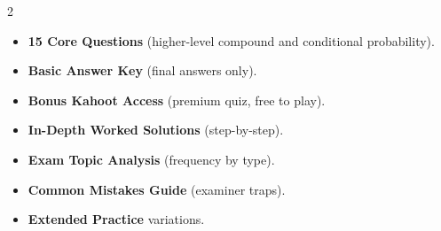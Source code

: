 \documentclass[11pt,a4paper]{article}
\newcommand{\FullReleaseDate}{April 30, 2026}
\begin{document}
\vspace{8pt}

\begin{multicols}{2}
  \begin{tcolorbox}[card, title=\sffamily\bfseries\textcolor{white}{\faHandPointDown\ TODAY (Simplified Version)}, colbacktitle=mainblue, boxed title style={sharp corners, boxrule=0pt}]
    \begin{itemize}[leftmargin=1.2em, itemsep=2pt]
      \item \small \textbf{15 Core Questions} (higher-level compound and conditional probability).
      \item \small \textbf{Basic Answer Key} (final answers only).
      \item \small \textbf{Bonus Kahoot Access} (premium quiz, free to play).
    \end{itemize}
  \end{tcolorbox}

  \columnbreak

  \begin{tcolorbox}[card, title=\sffamily\bfseries\textcolor{white}{\faRocket\ ON \FullReleaseDate\ (Full Upgrade)}, colbacktitle=mainblue, boxed title style={sharp corners, boxrule=0pt}]
    \begin{itemize}[leftmargin=1.2em, itemsep=2pt]
      \item \small \textbf{In-Depth Worked Solutions} (step-by-step).
      \item \small \textbf{Exam Topic Analysis} (frequency by type).
      \item \small \textbf{Common Mistakes Guide} (examiner traps).
      \item \small \textbf{Extended Practice} variations.
    \end{itemize}
  \end{tcolorbox}
\end{multicols}
\end{document}

